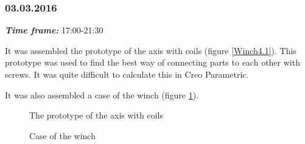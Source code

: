 \subsubsection{03.03.2016}
\textit{\textbf{Time frame:}} 17:00-21:30 

 It was assembled the prototype of the axis with coils (figure \ref{Winch4.1}). This prototype was used to find the best way of connecting parts to each other with screws. It was quite difficult to calculate this in Creo Parametric. 
 
 It was also assembled a case of the winch (figure \ref{Winch4.2}).


\begin{figure}[H]
	\begin{minipage}[h]{0.47\linewidth}
		\caption{The prototype of the axis with coils}
		\label{Winch4.1}
	\end{minipage}
	\hfill
	\begin{minipage}[h]{0.47\linewidth}
		\caption{Case of the winch}
		\label{Winch4.2}
	\end{minipage}
\end{figure}